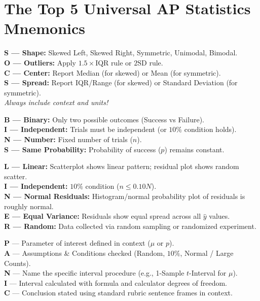 \documentclass[11pt,oneside,openany]{book}
\begin{document}
\section*{The Top 5 Universal AP Statistics Mnemonics}

\begin{mnemonicbox}
\textbf{S --- Shape:} Skewed Left, Skewed Right, Symmetric, Unimodal, Bimodal.\\
\textbf{O --- Outliers:} Apply $1.5 \times \text{IQR}$ rule or $2\text{SD}$ rule.\\
\textbf{C --- Center:} Report Median (for skewed) or Mean (for symmetric).\\
\textbf{S --- Spread:} Report IQR/Range (for skewed) or Standard Deviation (for symmetric).\\
\textit{Always include context and units!}
\end{mnemonicbox}

\begin{mnemonicbox}
\textbf{B --- Binary:} Only two possible outcomes (Success vs Failure).\\
\textbf{I --- Independent:} Trials must be independent (or $10\%$ condition holds).\\
\textbf{N --- Number:} Fixed number of trials ($n$).\\
\textbf{S --- Same Probability:} Probability of success ($p$) remains constant.
\end{mnemonicbox}

\begin{mnemonicbox}
\textbf{L --- Linear:} Scatterplot shows linear pattern; residual plot shows random scatter.\\
\textbf{I --- Independent:} $10\%$ condition ($n \le 0.10N$).\\
\textbf{N --- Normal Residuals:} Histogram/normal probability plot of residuals is roughly normal.\\
\textbf{E --- Equal Variance:} Residuals show equal spread across all $\hat{y}$ values.\\
\textbf{R --- Random:} Data collected via random sampling or randomized experiment.
\end{mnemonicbox}

\begin{mnemonicbox}
\textbf{P} --- Parameter of interest defined in context ($\mu$ or $p$).\\
\textbf{A} --- Assumptions \& Conditions checked (Random, $10\%$, Normal / Large Counts).\\
\textbf{N} --- Name the specific interval procedure (e.g., 1-Sample $t$-Interval for $\mu$).\\
\textbf{I} --- Interval calculated with formula and calculator degrees of freedom.\\
\textbf{C} --- Conclusion stated using standard rubric sentence frames in context.
\end{mnemonicbox}
\end{document}
